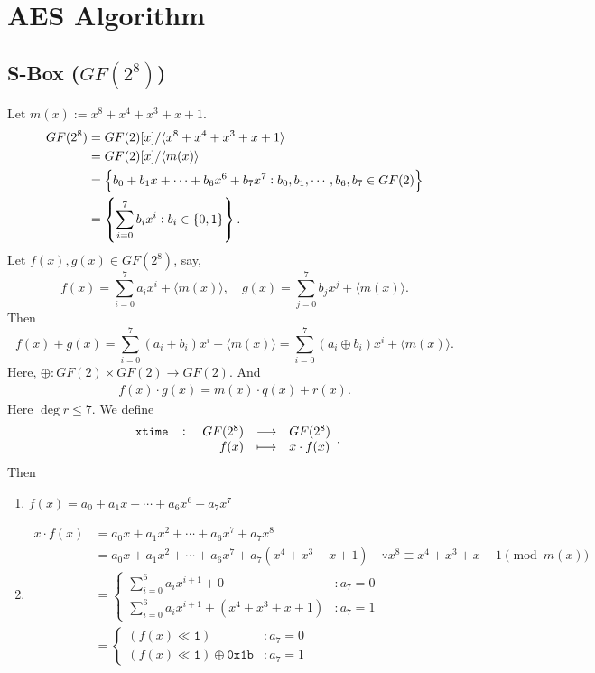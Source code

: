\chapter{AES Algorithm}

\section{S-Box ($GF(2^8)$)}

Let $m(x):=x^8+x^4+x^3+x+1$.
\begin{align*}
	GF(2^8)&=GF(2)[x]/\langle x^8+x^4+x^3+x+1\rangle \\
	&=GF(2)[x]/\langle m(x)\rangle \\
	&=\set{b_0+b_1x+\cdots+b_6x^6+b_7x^7:b_0,b_1,\cdots, b_6,b_7\in GF(2)}\\
	&=\set{\sum_{i=0}^7b_ix^i:b_i\in\set{0,1}}.
\end{align*}
Let $f(x),g(x)\in GF(2^8)$, say, \[
f(x)=\sum_{i=0}^7a_ix^i+\langle m(x)\rangle,\quad g(x)=\sum_{j=0}^7b_jx^j+\langle m(x)\rangle.
\] Then
\[
f(x)+g(x)=\sum_{i=0}^7(a_i+b_i)x^i+\langle m(x)\rangle=\sum_{i=0}^7(a_i\oplus b_i)x^i+\langle m(x)\rangle.
\] Here, $\oplus:GF(2)\times GF(2)\to GF(2)$. And \begin{align*}
	f(x)\cdot g(x)=m(x)\cdot q(x) + r(x).
\end{align*} Here $\deg r \leq 7$.
\newpage
We define \[
\fullfunction{\texttt{xtime}}{GF(2^8)}{GF(2^8)}{f(x)}{x\cdot f(x)}.
\]
Then \begin{enumerate}
	\item $f(x) = a_0 + a_1x + \cdots + a_6x^6 + a_7x^7$
	\item \begin{align*}
		x\cdot f(x) &= a_0x + a_1x^2 + \cdots + a_6x^7 + a_7x^8 \\
		&= a_0x + a_1x^2 + \cdots + a_6x^7 + a_7(x^4+x^3+x+1)\quad\because x^8\equiv x^4+x^3+x+1\pmod{m(x)} \\
		&=\begin{cases}
			\sum_{i=0}^6a_ix^{i+1} + 0 &:a_7=0\\
			\sum_{i=0}^6a_ix^{i+1} + (x^4+x^3+x+1) &:a_7=1
		\end{cases} \\
		&=\begin{cases}
			(f(x) \ll \texttt{1}) &:a_7=0\\
			(f(x) \ll \texttt{1}) \oplus \texttt{0x1b} &:a_7=1
		\end{cases}
	\end{align*}
\end{enumerate}

